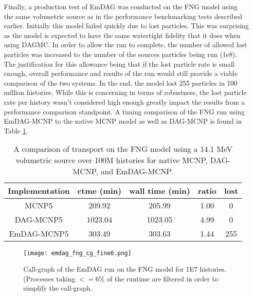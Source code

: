 Finally, a production test of EmDAG was conducted on the FNG model using the
same volumetric source as in the performance benchmarking tests described
earlier. Initially this model failed quickly due to lost particles. This was
surprising as the model is expected to have the same watertight fidelity that it
does when using DAGMC. In order to allow the run to complete, the number of
allowed lost particles was increased to the number of the sources particles
being run (1e8). The justification for this allowance being that if the lost
particle rate is small enough, overall performance and results of the run would
still provide a viable comparison of the two systems. In the end, the model lost
255 particles in 100 million histories. While this is concerning in terms of
robustness, the lost particle rate per history wasn't considered high enough
greatly impact the results from a performance comparison standpoint. A timing
comparison of the FNG run using EmDAG-MCNP to the native MCNP model as well as
DAG-MCNP is found in Table \ref{fngemdag}.

\begin{table}[H]
  \small
  \begin{center}
        \begin{tabular}{|c|c|c|c|c|}
      \hline
      \textbf{Implementation} & \textbf{ctme (min)} & \textbf{wall time (min)} & \textbf{ratio} & \textbf{lost} \\
      \hline
      MCNP5 & 209.92 & 205.99 &  1.00 & 0 \\
      \hline
      DAG-MCNP5 & 1023.04 & 1023.05 & 4.99 & 0  \\
      \hline      
      EmDAG-MCNP5 & 303.49 & 303.63 & 1.44 & 255  \\
      \hline
    \end{tabular} 
    \caption{A comparison of transport on the FNG model using a 14.1 MeV
      volumetric source over 100M histories for native MCNP, DAG-MCNP, and
      EmDAG-MCNP.}
    \label{fngemdag}
  \end{center}
\end{table}

\begin{figure}
  \centering
  \texttt{[image: emdag\_fng\_cg\_fine6.png]}
  \caption{Call-graph of the EmDAG run on the FNG model for 1E7
    histories. (Processes taking $<=$6\% of the runtime are filtered in order to
    simplify the call-graph.}
  \label{emdag-fng-coarse}  
\end{figure}

